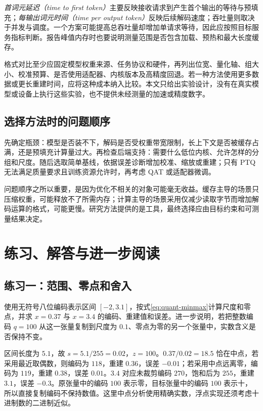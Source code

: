 \documentclass[UTF8,12pt,a4paper,fontset=fandol]{ctexart}
\begin{document}
\emph{首词元延迟（time to first token）}主要反映接收请求到产生首个输出的等待与预填充；\emph{每输出词元时间（time per output token）}反映后续解码速度；吞吐量则取决于并发与调度。一个方案可能提高总吞吐量却增加单请求等待，因此应按照目标服务指标判断。报告峰值内存时也要说明测量范围是否包含加载、预热和最大长度缓存。

格式对比至少应固定模型权重来源、任务协议和硬件，再列出位宽、量化轴、组大小、校准预算、是否使用适配器、内核版本及高精度回退。若一种方法使用更多数据或更长重建时间，应将这种成本纳入比较。本文只给出实验设计，没有在真实模型或设备上执行这些实验，也不提供未经测量的加速或精度数字。

\subsection{选择方法时的问题顺序}
先确定瓶颈：模型是否装不下，解码是否受权重带宽限制，长上下文是否被缓存占满，还是预填充计算量过大。再检查后端支持：需要什么低位内核、允许怎样的分组和尺度。随后选取简单基线，依据误差诊断增加校准、缩放或重建；只有 PTQ 无法满足质量要求且训练资源允许时，再考虑 QAT 或适配器微调。

问题顺序之所以重要，是因为优化不相关的对象可能毫无收益。缓存主导的场景只压缩权重，可能释放不了所需内存；计算主导的场景采用仅减少读取字节而增加解码运算的格式，可能更慢。研究方法提供的是工具，最终选择应由目标约束和可测量结果决定。

\section{练习、解答与进一步阅读}
\label{sec:quant-exercises}

\subsection{练习一：范围、零点和舍入}
使用无符号八位编码表示区间 $[-2,3.1]$，按式\eqref{eq:quant-minmax}计算尺度和零点，并求 $x=0.37$ 与 $x=3.4$ 的编码、重建值和误差。进一步说明，若把整数编码 $q=100$ 从这一张量复制到尺度为 $0.1$、零点为零的另一个张量中，实数含义是否保持不变。

\begin{solve}
区间长度为 $5.1$，故 $s=5.1/255=0.02$，$z=100$。$0.37/0.02=18.5$ 恰在中点，若采用最近取偶数，则编码为 $118$，重建 $0.36$，误差 $-0.01$；若采用中点远离零，编码为 $119$，重建 $0.38$，误差 $0.01$。$3.4$ 对应未裁剪编码 $270$，饱和后为 $255$，重建 $3.1$，误差 $-0.3$。原张量中的编码 $100$ 表示零，目标张量中的编码 $100$ 表示十，所以直接复制编码不保持数值。这里中点分析使用精确实数，浮点实现还须考虑十进制数的二进制近似。
\end{solve}
\end{document}

